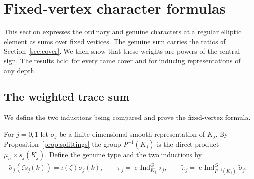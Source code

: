 \documentclass[12pt,letterpaper]{article}
\numberwithin{equation}{section}
\theoremstyle{definition}
\theoremstyle{remark}
\newcommand{\Gt}{\widetilde G}
\newcommand{\cInd}{\operatorname{c-Ind}}
\begin{document}
\section{Fixed-vertex character formulas}\label{sec:frob}
This section expresses the ordinary and genuine characters at a regular elliptic element as sums over fixed vertices. The genuine sum carries the ratios of Section~\ref{sec:cover}. We then show that these weights are powers of the central sign. The results hold for every tame cover and for inducing representations of any depth.

\subsection*{The weighted trace sum}
We define the two inductions being compared and prove the fixed-vertex formula.

For $j=0,1$ let $\sigma_j$ be a finite-dimensional smooth representation of $K_j$. By Proposition~\ref{prop:splittings} the group $P^{-1}(K_j)$ is the direct product $\mu_n\times s_j(K_j)$. Define the genuine type and the two inductions by
\begin{equation}\label{eq:inductions}
 \widetilde\sigma_j(\zeta s_j(k))=\iota(\zeta)\sigma_j(k),\qquad
 \pi_j=\cInd_{K_j}^G\sigma_j,\qquad
 \widetilde\pi_j=\cInd_{P^{-1}(K_j)}^{\Gt}\widetilde\sigma_j .
\end{equation}
\end{document}

